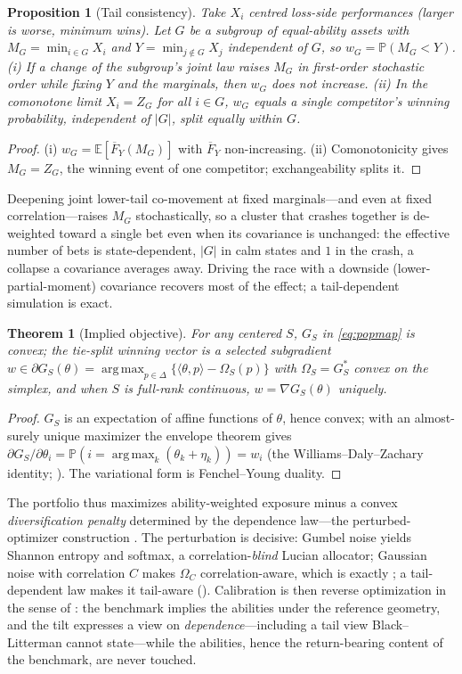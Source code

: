 \documentclass[11pt]{article}
\newtheorem{theorem}{Theorem}
\newtheorem{proposition}{Proposition}
\newcommand{\E}{\mathbb{E}}
\newcommand{\Prob}{\mathbb{P}}
\DeclareMathOperator*{\argmaxop}{arg\,max}
\begin{document}
\begin{proposition}[Tail consistency]
\label{prop:tail}
Take $X_i$ centred loss-side performances (larger is worse, minimum wins). Let
$G$ be a subgroup of equal-ability assets with $M_G = \min_{i\in G} X_i$ and
$Y = \min_{j\notin G} X_j$ independent of $G$, so $w_G = \Prob(M_G < Y)$.
(i) If a change of the subgroup's joint law raises $M_G$ in first-order
stochastic order while fixing $Y$ and the marginals, then $w_G$ does not
increase. (ii) In the comonotone limit $X_i = Z_G$ for all $i \in G$, $w_G$
equals a single competitor's winning probability, independent of $|G|$, split
equally within $G$.
\end{proposition}
\begin{proof}
(i) $w_G = \E[\overline F_Y(M_G)]$ with $\overline F_Y$ non-increasing. (ii)
Comonotonicity gives $M_G = Z_G$, the winning event of one competitor;
exchangeability splits it.
\end{proof}
Deepening joint lower-tail co-movement at fixed marginals---and even at fixed
correlation---raises $M_G$ stochastically, so a cluster that crashes together
is de-weighted toward a single bet even when its covariance is unchanged: the
effective number of bets is state-dependent, $|G|$ in calm states and $1$ in
the crash, a collapse a covariance averages away. Driving the race with a
downside (lower-partial-moment) covariance recovers most of the effect; a
tail-dependent simulation is exact.

\begin{theorem}[Implied objective]
\label{thm:objective}
For any centered $S$, $G_S$ in \eqref{eq:popmap} is convex; the tie-split
winning vector is a selected subgradient
$w \in \partial G_S(\theta) = \argmaxop_{p\in\Delta}\{\langle\theta,p\rangle -
\Omega_S(p)\}$ with $\Omega_S = G_S^{*}$ convex on the simplex, and when $S$ is
full-rank continuous, $w = \nabla G_S(\theta)$ uniquely.
\end{theorem}
\begin{proof}
$G_S$ is an expectation of affine functions of $\theta$, hence convex; with an
almost-surely unique maximizer the envelope theorem gives
$\partial G_S/\partial\theta_i = \Prob(i = \argmaxop_k(\theta_k+\eta_k)) = w_i$
(the Williams--Daly--Zachary identity;
\cite{williams1977,mcfadden1981}). The variational form is Fenchel--Young
duality.
\end{proof}
The portfolio thus maximizes ability-weighted exposure minus a convex
\emph{diversification penalty} determined by the dependence law---the
perturbed-optimizer construction \parencite{berthet2020}. The perturbation is
decisive: Gumbel noise yields Shannon entropy and softmax, a
correlation-\emph{blind} Lucian allocator; Gaussian noise with correlation $C$
makes $\Omega_C$ correlation-aware, which is exactly
; a tail-dependent law makes it tail-aware
(). Calibration is then reverse optimization in the sense of
\textcite{black1992}: the benchmark implies the abilities under the reference
geometry, and the tilt expresses a view on \emph{dependence}---including a
tail view Black--Litterman cannot state---while the abilities, hence the
return-bearing content of the benchmark, are never touched.
\end{document}
